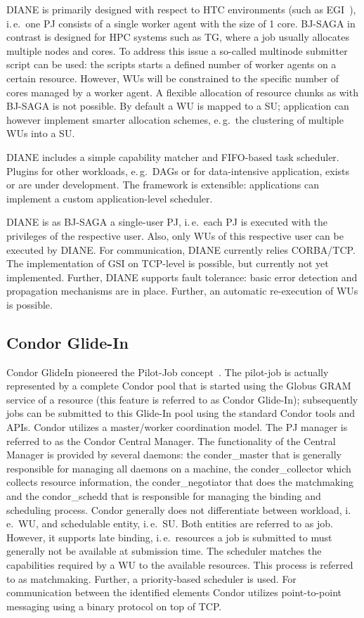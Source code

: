 \documentclass[conference,final]{IEEEtran}
\newcommand{\upp}{\vspace*{-0.5em}}
\begin{document}
DIANE is primarily designed with respect to HTC environments (such as
EGI~\cite{egi}), i.\,e.\ one PJ consists of a single worker agent with the size
of 1 core. BJ-SAGA in contrast is designed for HPC systems such as TG, where a
job usually allocates multiple nodes and cores. To address this issue a
so-called multinode submitter script can be used: the scripts starts a defined
number of worker agents on a certain resource. However, WUs will be constrained
to the specific number of cores managed by a worker agent. A flexible allocation
of resource chunks as with BJ-SAGA is not possible. By default a WU is mapped to
a SU; application can however implement smarter allocation schemes, e.\,g.\ the
clustering of multiple WUs into a SU.

DIANE includes a simple capability matcher and FIFO-based task scheduler.
Plugins for other workloads, e.\,g.\ DAGs or for data-intensive
application, exists or are under development. The framework is extensible:
applications can implement a custom application-level scheduler.


DIANE is as BJ-SAGA a single-user PJ, i.\,e.\ each PJ is executed with the
privileges of the respective user. Also, only WUs of this respective user can be
executed by DIANE. For communication, DIANE currently relies CORBA/TCP. The 
implementation of GSI on TCP-level is possible, but currently not yet 
implemented. Further, DIANE supports fault tolerance: basic error detection and propagation mechanisms are in place. Further, an automatic re-execution of WUs is possible.


\subsection{Condor Glide-In\upp\upp}

Condor GlideIn pioneered the Pilot-Job concept~\cite{condor-g}. The pilot-job is
actually represented by a complete Condor pool that is started using the Globus
GRAM service of a resource (this feature is referred to as Condor Glide-In);
subsequently jobs can be submitted to this Glide-In pool using the standard
Condor tools and APIs. Condor utilizes a master/worker coordination model. The
PJ manager is referred to as the Condor Central Manager. The functionality of
the Central Manager is provided by several daemons: the conder\_master that is
generally responsible for managing all daemons on a machine, the
conder\_collector which collects resource information, the conder\_negotiator
that does the matchmaking and the condor\_schedd that is responsible for
managing the binding and scheduling process. Condor generally does not
differentiate between workload, i.\,e.\ WU, and schedulable entity, i.\,e.\ SU.
Both entities are referred to as job. However, it supports late binding,
i.\,e.\ resources a job is submitted to must generally not be available at
submission time. The scheduler matches the capabilities required by a WU to the
available resources. This process is referred to as matchmaking. Further, a
priority-based scheduler is used. For communication between the identified
elements Condor utilizes point-to-point messaging using a binary protocol on top
of TCP.
\end{document}
